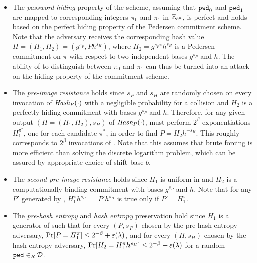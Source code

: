 \begin{itemize}
  \item The \emph{password hiding} property of the scheme, assuming that $\mathtt{pwd}_0$ and $\mathtt{pwd}_1$ are mapped to corresponding integers $\pi_0$ and $\pi_1$ in $\mathbb{Z}_{b^n}$, is perfect and holds based on the perfect hiding property of the Pedersen commitment scheme. 
    Note that the adversary receives the corresponding hash value $H=(H_1, H_2)=(g^{s_P}, Ph^{s_H})$, where $H_2= g^{s_P\pi}h^{s_H}$ is a Pedersen commitment on $\pi$ with respect to two independent bases $g^{s_P}$ and $h$. 
    The ability of \cA to distinguish between $\pi_0$ and $\pi_1$ can thus be turned into an attack on the hiding property of the commitment scheme.

  \item The \emph{pre-image resistance} holds since $s_P$ and $s_H$ are randomly chosen on every invocation of $\mathit{Hash_P}(\cdot)$ with a negligible probability for a collision and $H_2$ is a perfectly hiding commitment with bases $g^{s_P}$ and $h$. 
    Therefore, for any given output $(H=(H_1, H_2), s_H)$ of $\mathit{Hash_P}(\cdot)$, \cA must perform $2^\beta$ exponentiations $H_1^{\pi^\ast}$, one for each candidate $\pi^\ast$, in order to find $P = H_2h^{-s_H}$. 
    This roughly corresponds to $2^\beta$ invocations of \PPreHash.
    Note that this assumes that brute forcing \cD is more efficient than solving the discrete logarithm problem, which can be assured by appropriate choice of shift base $b$.

  \item The \emph{second pre-image resistance} holds since $H_1$ is uniform in \GG and $H_2$ is a computationally binding commitment with bases $g^{s_P}$ and $h$. 
    Note that for any $P'$ generated by \cA, $H_1^\pi h^{s_H}$ $=P'h^{s_H}$ is true only if $P'=H_1^\pi$.
	
	\item The \emph{pre-hash entropy} and \emph{hash entropy} preservation hold since $H_1$ is a generator of \GG such that for every $(P,s_P)$ chosen by the pre-hash entropy adversary, $\Pr[P=H_1^\pi]\leq2^{-\beta}+\varepsilon(\lambda)$, and for every $(H,s_H)$ chosen by the hash entropy adversary, $\Pr[H_2=H_1^\pi h^{s_H}]\leq2^{-\beta}+\varepsilon(\lambda)$ for a random $\mathtt{pwd}\in_R\mathcal{D}$.
\end{itemize}

